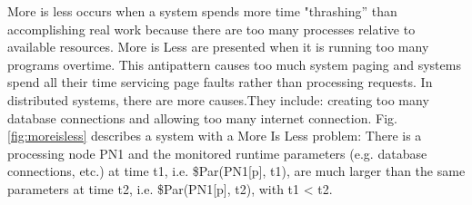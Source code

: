 More is less occurs when a system spends more time "thrashing” than accomplishing real work because there are too many processes relative to available resources. More is Less are presented when it is running too many programs overtime. This antipattern causes too much system paging and systems spend all their time servicing page faults rather than processing requests. In distributed systems, there are more causes.They include: creating too many database connections and  allowing too many internet connection. Fig. \ref{fig:moreisless} describes a system  with a More Is Less problem: There is a processing node PN1 and the monitored runtime parameters (e.g. database connections, etc.) at time t1, i.e. \$Par(PN1[p], t1), are much larger than the same parameters at time t2, i.e. \$Par(PN1[p], t2), with t1 < t2. 






